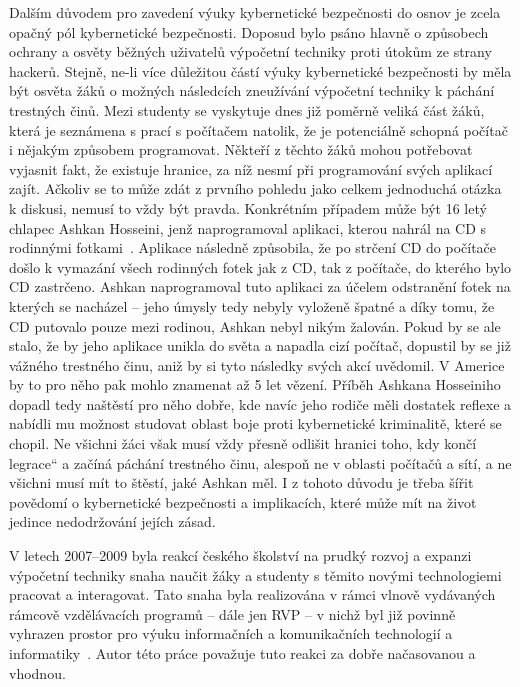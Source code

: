\documentclass[a4paper, 12pt]{article}
\providecommand{\uv}[1]{\quotedblbase #1\textquotedblleft}
\begin{document}
Dalším důvodem pro zavedení výuky kybernetické bezpečnosti do osnov je zcela opačný pól kybernetické bezpečnosti. Doposud bylo psáno hlavně o způsobech ochrany a osvěty běžných uživatelů výpočetní techniky proti útokům ze strany hackerů. Stejně, ne-li více důležitou částí výuky kybernetické bezpečnosti by měla být osvěta žáků o možných následcích zneužívání výpočetní techniky k páchání trestných činů. Mezi studenty se vyskytuje dnes již poměrně veliká část žáků, která je seznámena s prací s počítačem natolik, že je potenciálně schopná počítač i nějakým způsobem programovat. Někteří z těchto žáků mohou potřebovat vyjasnit fakt, že existuje hranice, za níž nesmí při programování svých aplikací zajít. Ačkoliv se to může zdát z prvního pohledu jako celkem jednoduchá otázka k diskusi, nemusí to vždy být pravda. Konkrétním případem může být 16 letý chlapec Ashkan Hosseini, jenž naprogramoval aplikaci, kterou nahrál na CD s rodinnými fotkami~\cite{malwareUnicornAppretince}. Aplikace následně způsobila, že po strčení CD do počítače došlo k vymazání všech rodinných fotek jak z CD, tak z počítače, do kterého bylo CD zastrčeno. Ashkan naprogramoval tuto aplikaci za účelem odstranění fotek na kterých se nacházel -- jeho úmysly tedy nebyly vyloženě špatné a díky tomu, že CD putovalo pouze mezi rodinou, Ashkan nebyl nikým žalován. Pokud by se ale stalo, že by jeho aplikace unikla do světa a napadla cizí počítač, dopustil by se již vážného trestného činu, aniž by si tyto následky svých akcí uvědomil. V Americe by to pro něho pak mohlo znamenat až 5 let vězení. Příběh Ashkana Hosseiniho dopadl tedy naštěstí pro něho dobře, kde navíc jeho rodiče měli dostatek reflexe a nabídli mu možnost studovat oblast boje proti kybernetické kriminalitě, které se chopil. Ne všichni žáci však musí vždy přesně odlišit hranici toho, kdy končí \uv{legrace} a začíná páchání trestného činu, alespoň ne v oblasti počítačů a sítí, a ne všichni musí mít to štěstí, jaké Ashkan měl. I z tohoto důvodu je třeba šířit povědomí o kybernetické bezpečnosti a implikacích, které může mít na život jedince nedodržování jejích zásad. 

V letech 2007--2009 byla reakcí českého školství na prudký rozvoj a expanzi výpočetní techniky snaha naučit žáky a studenty s těmito novými technologiemi pracovat a interagovat. Tato snaha byla realizována v rámci vlnově vydávaných rámcově vzdělávacích programů -- dále jen RVP -- v nichž byl již povinně vyhrazen prostor pro výuku informačních a komunikačních technologií a informatiky~\cite{waveRVP}. Autor této práce považuje tuto reakci za dobře načasovanou a vhodnou. 
\end{document}
